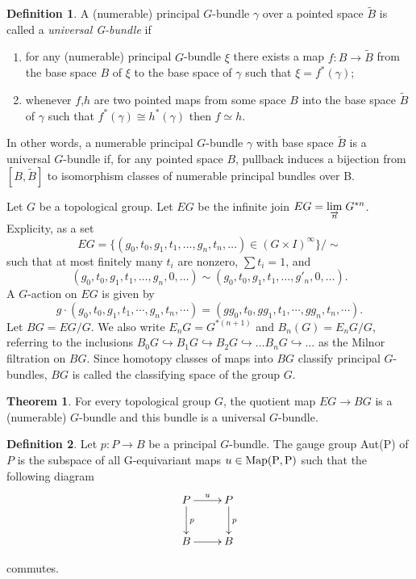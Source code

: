 \documentclass[A4,11pt,oneside]{book}
\theoremstyle{definition}
\newtheorem{teo}{Theorem}
\newtheorem{defi}{Definition}
\begin{document}
\begin{defi}
A (numerable) principal $G$-bundle $\gamma$ over a pointed space $\tilde B$ is called a \emph{universal G-bundle} if 
\begin{enumerate}
 \item for any (numerable) principal $G$-bundle $\xi$ there exists a map $f:B\rightarrow\tilde B$ from the base space $B$ of $\xi$ to the base space of $\gamma$ such that $\xi=f^{*}(\gamma)$;
 \item whenever $f$,$h$ are two pointed maps from some space $B$ into the base space $\tilde B$ of $\gamma$ such that $f^{*}(\gamma)\cong h^{*}(\gamma)$ then $f\simeq h$.
 \end{enumerate}
\end{defi}

In other words, a numerable principal $G$-bundle $\gamma$ with base space $\tilde B$ is a universal $G$-bundle if, for any pointed space $B$, pullback induces a bijection from $[B,\tilde B]$ to isomorphism classes of numerable principal bundles over B. 

Let $G$ be a topological group. Let $EG$ be the infinite join $EG=\underset{\overrightarrow{n}}{\rm{lim}}\;G^{*n}$. Explicity, as a set 
\begin{equation*}
EG=\{(g_0,t_0,g_1,t_1,\dots,g_n,t_n,\dots)\in(G\times I)^{\infty}\}/\sim
\end{equation*}
such that at most finitely many $t_i$ are nonzero, $\sum t_i=1$, and
\begin{equation*}
(g_0,t_0,g_1,t_1,\dots,g_n,0,\dots)\sim(g_0,t_0,g_1,t_1,\dots,g'_n,0,\dots).
\end{equation*}
A $G$-action on $EG$ is given by
\begin{equation*}
g\cdot(g_0,t_0,g_1,t_1,\cdots,g_n,t_n,\cdots)=(gg_0,t_0,gg_1,t_1,\cdots,gg_n,t_n,\cdots).
\end{equation*}
Let $BG=EG/G$. We also write $E_nG=G^{*(n+1)}$ and $B_n(G)=E_nG/G$, referring to the inclusions $B_0G\hookrightarrow B_1G\hookrightarrow B_2G \hookrightarrow\dots B_nG\hookrightarrow\dots $ as the Milnor filtration on $BG$.
Since homotopy classes of maps into $BG$ classify principal $G$-bundles, $BG$ is called the classifying space of the group $G$. 
\begin{teo}
For every topological group $G$, the quotient map $EG\rightarrow BG$ is a (numerable) $G$-bundle and this bundle is a universal $G$-bundle.
\end{teo}

\begin{defi}
Let $p:P\rightarrow B$ be a principal $G$-bundle. The gauge group Aut(P) of $P$ is the subspace of all G-equivariant maps $u\in{\rm{Map(P,P)}}$ such that  the following diagram
\begin{displaymath}
\xymatrix{ 
P\ar[r]^u\ar[d]^{p} &P\ar[d]^{p} \\
B\ar[r] &B
}
\end{displaymath}

 commutes.
\end{defi}
\end{document}
